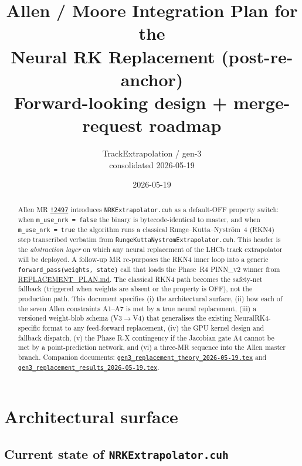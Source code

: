\documentclass[11pt,a4paper]{article}
\title{Allen / Moore Integration Plan for the\\
       Neural RK Replacement (post-re-anchor)\\
       \large Forward-looking design + merge-request roadmap}
\author{TrackExtrapolation / gen-3 \\ \small consolidated 2026-05-19}
\date{2026-05-19}
\newcommand{\code}[1]{\texttt{#1}}
\begin{document}
\maketitle

\begin{abstract}
Allen MR \href{https://gitlab.cern.ch/lhcb/Allen/-/merge_requests/2497}{\code{!2497}}
introduces \code{NRKExtrapolator.cuh} as a default-OFF property switch:
when \code{m\_use\_nrk = false} the binary is bytecode-identical to master, and
when \code{m\_use\_nrk = true} the algorithm runs a classical
Runge--Kutta--Nystr{\"o}m~4 (RKN4) step transcribed verbatim from
\code{RungeKuttaNystromExtrapolator.cuh}. This header is the
\emph{abstraction layer} on which any neural replacement of the LHCb track
extrapolator will be deployed. A follow-up MR re-purposes the RKN4 inner
loop into a generic \code{forward\_pass(weights, state)} call that loads the
Phase~R4 PINN\_v2 winner from
\href{run:../../experiments/gen_3/REPLACEMENT_PLAN.md}{REPLACEMENT\_PLAN.md}.
The classical RKN4 path becomes the safety-net fallback (triggered when
weights are absent or the property is OFF), not the production path. This
document specifies (i) the architectural surface, (ii) how each of the seven
Allen constraints A1--A7 is met by a true neural replacement, (iii) a
versioned weight-blob schema (V3$\to$V4) that generalises the existing
NeuralRK4-specific format to any feed-forward replacement, (iv) the GPU
kernel design and fallback dispatch, (v) the Phase R-X contingency if the
Jacobian gate A4 cannot be met by a point-prediction network, and (vi) a
three-MR sequence into the Allen master branch. Companion documents:
\href{run:gen3_replacement_theory_2026-05-19.tex}{\code{gen3\_replacement\_theory\_2026-05-19.tex}}
and
\href{run:gen3_replacement_results_2026-05-19.tex}{\code{gen3\_replacement\_results\_2026-05-19.tex}}.
\end{abstract}

\tableofcontents

\section{Architectural surface}
\label{sec:surface}

\subsection{Current state of \code{NRKExtrapolator.cuh}}
\label{sec:nrk-current}
\end{document}
